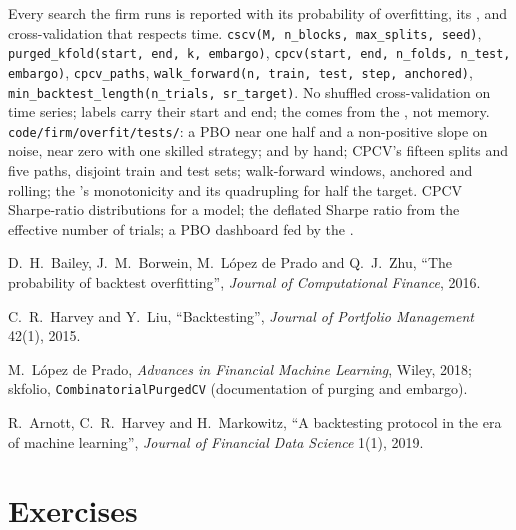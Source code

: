 \begin{build}
 Every search the firm runs is reported with its probability of overfitting, its , and cross-validation that respects
time.
 \texttt{cscv(M, n\_blocks, max\_splits, seed)}, \texttt{purged\_kfold(start, end, k, embargo)}, \texttt{cpcv(start, end, n\_folds, n\_test, embargo)},
\texttt{cpcv\_paths}, \texttt{walk\_forward(n, train, test, step, anchored)}, \texttt{min\_backtest\_length(n\_trials, sr\_target)}.
 No shuffled cross-validation on time series; labels carry their start and end; the  comes from the , not memory.
 \texttt{code/firm/overfit/tests/}: a PBO near one half and a non-positive slope on noise, near zero with one skilled strategy;  and
 by hand; CPCV's fifteen splits and five paths, disjoint train and test sets; walk-forward windows, anchored and rolling; the 's
monotonicity and its quadrupling for half the target.
 CPCV Sharpe-ratio distributions for a model; the deflated Sharpe ratio from the effective number of trials; a PBO dashboard fed by the .
\end{build}

\begin{omsources}
\item D.~H.~Bailey, J.~M.~Borwein, M.~López de Prado and Q.~J.~Zhu, ``The probability of backtest overfitting'', \emph{Journal of Computational Finance}, 2016.
\item C.~R.~Harvey and Y.~Liu, ``Backtesting'', \emph{Journal of Portfolio Management} 42(1), 2015.
\item M.~López de Prado, \emph{Advances in Financial Machine Learning}, Wiley, 2018; skfolio, \texttt{CombinatorialPurgedCV} (documentation of purging and embargo).
\item R.~Arnott, C.~R.~Harvey and H.~Markowitz, ``A backtesting protocol in the era of machine learning'', \emph{Journal of Financial Data Science} 1(1), 2019.
\end{omsources}

\section{Exercises}

